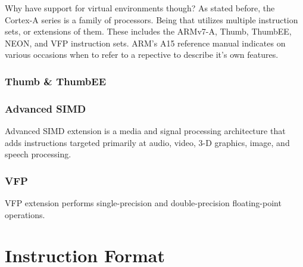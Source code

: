 \documentclass[12pt]{scrreprt}
\begin{document}
	Why have support for virtual environments though? As stated before, the Cortex-A series is a family of processors. Being that utilizes multiple instruction sets, or extensions of them. These includes the ARMv7-A, Thumb, ThumbEE, NEON, and VFP instruction sets. ARM's A15 reference manual indicates on various occasions when to refer to a repective to describe it's own features.

		\subsection{Thumb \& ThumbEE}



		\subsection{Advanced SIMD}

		Advanced SIMD extension is a media and signal processing architecture that adds instructions targeted primarily at audio, video, 3-D 
		graphics, image, and speech processing.
		
		\subsection{VFP}
		VFP extension performs single-precision and double-precision floating-point operations.
	

{\let\clearpage\relax\chapter{Instruction Format}}
\end{document}

